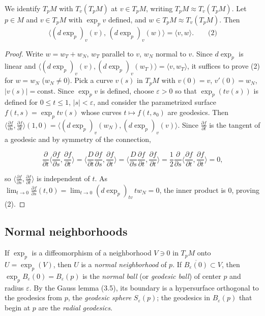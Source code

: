 \begin{lemma}[Gauss]
  \label{lem:dc-ch3-3-5}
  \notready
  \notready
  We identify $T_pM$ with $T_v(T_pM)$ at $v\in T_pM$, writing $T_pM\approx T_v(T_pM)$.
  Let $p\in M$ and $v\in T_pM$ with $\exp_p v$ defined, and $w\in T_pM\approx T_v(T_pM)$.
  Then
  $$
  \langle(d\exp_p)_v(v),\,(d\exp_p)_v(w)\rangle=\langle v,w\rangle.\qquad\text{(2)}
  $$
\end{lemma}
\begin{proof}
  \sketch
  Write $w=w_T+w_N$, $w_T$ parallel to $v$, $w_N$ normal to $v$. Since
  $d\exp_p$ is linear and
  $\langle(d\exp_p)_v(v),(d\exp_p)_v(w_T)\rangle=\langle v,w_T\rangle$, it suffices
  to prove (2) for $w=w_N$ ($w_N\ne 0$). Pick a curve $v(s)$ in $T_pM$ with
  $v(0)=v$, $v'(0)=w_N$, $|v(s)|=\text{const}$. Since $\exp_p v$ is defined,
  choose $\varepsilon>0$ so that $\exp_p(tv(s))$ is defined for $0\le t\le 1$,
  $|s|<\varepsilon$, and consider the parametrized surface
  $f(t,s)=\exp_p tv(s)$ whose curves $t\mapsto f(t,s_0)$ are geodesics.
  Then $\langle\frac{\partial f}{\partial s},\frac{\partial f}{\partial t}\rangle(1,0)=\langle(d\exp_p)_v(w_N),(d\exp_p)_v(v)\rangle$.
  Since $\frac{\partial f}{\partial t}$ is the tangent of a geodesic and by symmetry
  of the connection,
  
  $$
  \frac{\partial}{\partial t}\Big\langle\frac{\partial f}{\partial s},\frac{\partial f}{\partial t}\Big\rangle=\Big\langle\frac{D}{\partial t}\frac{\partial f}{\partial s},\frac{\partial f}{\partial t}\Big\rangle=\Big\langle\frac{D}{\partial s}\frac{\partial f}{\partial t},\frac{\partial f}{\partial t}\Big\rangle=\frac12\frac{\partial}{\partial s}\Big\langle\frac{\partial f}{\partial t},\frac{\partial f}{\partial t}\Big\rangle=0,
  $$
  
  so $\langle\frac{\partial f}{\partial s},\frac{\partial f}{\partial t}\rangle$ is
  independent of $t$. As $\lim_{t\to0}\frac{\partial f}{\partial s}(t,0)=\lim_{t\to0}(d\exp_p)_{tv}\,t w_N=0$,
  the inner product is $0$, proving (2).
\end{proof}

\subsection{Normal neighborhoods}
If $\exp_p$ is a diffeomorphism of a neighborhood $V\ni 0$ in $T_pM$ onto
$U=\exp_p(V)$, then $U$ is a \emph{normal neighborhood} of $p$. If
$\overline{B_\varepsilon(0)}\subset V$, then $\exp_p B_\varepsilon(0)=B_\varepsilon(p)$
is the \emph{normal ball} (or \emph{geodesic ball}) of center $p$ and radius $\varepsilon$.
By the Gauss lemma (3.5), its boundary is a hypersurface orthogonal to the
geodesics from $p$, the \emph{geodesic sphere} $S_\varepsilon(p)$; the geodesics in
$B_\varepsilon(p)$ that begin at $p$ are the \emph{radial geodesics}.

